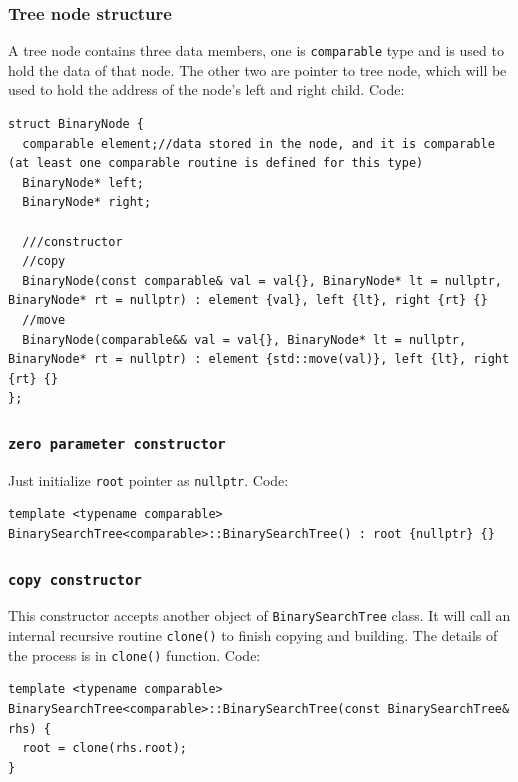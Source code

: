 \documentclass[12pt]{book}
\begin{document}
\subsubsection{Tree node structure}
\label{sec:org0f78c54}
A tree node contains three data members, one is \texttt{comparable} type and is used to hold the data of that node. The other two are pointer to tree node, which will be used to hold the address of the node's left and right child. Code:
\begin{verbatim}
struct BinaryNode {
  comparable element;//data stored in the node, and it is comparable (at least one comparable routine is defined for this type)
  BinaryNode* left;
  BinaryNode* right;

  ///constructor
  //copy
  BinaryNode(const comparable& val = val{}, BinaryNode* lt = nullptr, BinaryNode* rt = nullptr) : element {val}, left {lt}, right {rt} {}
  //move
  BinaryNode(comparable&& val = val{}, BinaryNode* lt = nullptr, BinaryNode* rt = nullptr) : element {std::move(val)}, left {lt}, right {rt} {}
};
\end{verbatim}

\subsubsection{\texttt{zero parameter constructor}}
\label{sec:org12323dd}
Just initialize \texttt{root} pointer as \texttt{nullptr}. Code:
\begin{verbatim}
template <typename comparable>
BinarySearchTree<comparable>::BinarySearchTree() : root {nullptr} {}
\end{verbatim}

\subsubsection{\texttt{copy constructor}}
\label{sec:org8da9a01}
This constructor accepts another object of \texttt{BinarySearchTree} class. It will call an internal recursive routine \texttt{clone()} to finish copying and building. The details of the process is in \texttt{clone()} function. Code:
\begin{verbatim}
template <typename comparable>
BinarySearchTree<comparable>::BinarySearchTree(const BinarySearchTree& rhs) {
  root = clone(rhs.root);
}
\end{verbatim}
\end{document}
